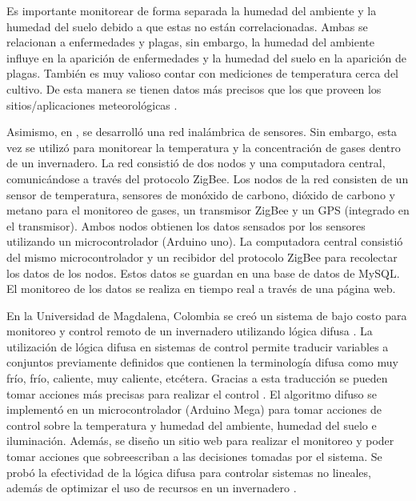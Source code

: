 Es importante monitorear de forma separada la humedad del ambiente y la humedad del suelo debido a que estas no están correlacionadas. Ambas se relacionan a enfermedades y plagas, sin embargo, la humedad del ambiente influye en la aparición de enfermedades y la humedad del suelo en la aparición de plagas. También es muy valioso contar con mediciones de temperatura cerca del cultivo. De esta manera se tienen datos más precisos que los que proveen los sitios/aplicaciones meteorológicas \cite{olive_orchard_monitorization}.

Asimismo, en \cite{wsn_greenhouse_gases}, se desarrolló una red inalámbrica de sensores. Sin embargo, esta vez se utilizó para monitorear la temperatura y la concentración de gases dentro de un invernadero. La red consistió de dos nodos y una computadora central, comunicándose a través del protocolo ZigBee. Los nodos de la red consisten de un sensor de temperatura, sensores de monóxido de carbono, dióxido de carbono y metano para el monitoreo de gases, un transmisor ZigBee y un GPS (integrado en el transmisor). Ambos nodos obtienen los datos sensados por los sensores utilizando un microcontrolador (Arduino uno). La computadora central consistió del mismo microcontrolador y un recibidor del protocolo ZigBee para recolectar los datos de los nodos. Estos datos se guardan en una base de datos de MySQL. El monitoreo de los datos se realiza en tiempo real a través de una página web.

En la Universidad de Magdalena, Colombia se creó un sistema de bajo costo para monitoreo y control remoto de un invernadero utilizando lógica difusa \cite{low_cost_fuzzy_logic_greenhouse}. La utilización de lógica difusa en sistemas de control permite traducir variables a conjuntos previamente definidos que contienen la terminología difusa como muy frío, frío, caliente, muy caliente, etcétera. Gracias a esta traducción se pueden tomar acciones más precisas para realizar el control \cite{agriculture_automation_review}. El algoritmo difuso se implementó en un microcontrolador (Arduino Mega) para tomar acciones de control sobre la temperatura y humedad del ambiente, humedad del suelo e iluminación. Además, se diseño un sitio web para realizar el monitoreo y poder tomar acciones que sobreescriban a las decisiones tomadas por el sistema. Se probó la efectividad de la lógica difusa para controlar sistemas no lineales, además de optimizar el uso de recursos en un 
invernadero \cite{low_cost_fuzzy_logic_greenhouse}.

